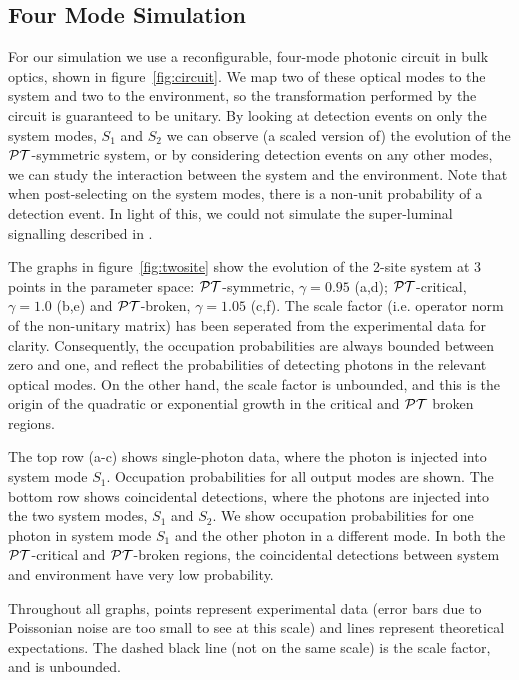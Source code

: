 \subsection{Four Mode Simulation}
\label{sec:FourMode}
For our simulation we use a reconfigurable, four-mode photonic circuit in bulk
optics, shown in figure~\ref{fig:circuit}. We map two of these optical
modes to the system and two to the environment, so the transformation performed
by the circuit is guaranteed to be unitary. By looking at detection events on
only the system modes, \(S_1\) and \(S_2\) we can observe (a scaled version of)
the evolution of the \(\mathcal{PT}{}\)-symmetric system, or by considering detection
events on any other modes, we can study the interaction between the system and
the environment. Note that when post-selecting on the system modes, there is a
non-unit probability of a detection event. In light of this, we could not
simulate the super-luminal signalling described in \cite{lee-prl-112-130404}.

The graphs in figure~\ref{fig:twosite} show the evolution of the 2-site system
at 3 points in the parameter space: \(\mathcal{PT}{}\)-symmetric, \(\gamma=0.95\) (a,d);
\(\mathcal{PT}{}\)-critical, \(\gamma=1.0\) (b,e) and \(\mathcal{PT}{}\)-broken, \(\gamma=1.05\)
(c,f). The scale factor (i.e. operator norm of the non-unitary matrix) has been
seperated from the experimental data for clarity. Consequently, the occupation
probabilities are always bounded between zero and one, and reflect the
probabilities of detecting photons in the relevant optical modes. On the other
hand, the scale factor is unbounded, and this is the origin of the quadratic or
exponential growth in the critical and \(\mathcal{PT}{}\) broken regions.

The top row (a-c) shows single-photon data, where the photon is injected into
system mode \(S_1\). Occupation probabilities for all output modes are shown.
The bottom row shows coincidental detections, where the photons are injected
into the two system modes, \(S_1\) and \(S_2\). We show occupation probabilities
for one photon in system mode \(S_1\) and the other photon in a different mode.
In both the \(\mathcal{PT}{}\)-critical and \(\mathcal{PT}{}\)-broken regions, the coincidental
detections between system and environment have very low probability.

Throughout all graphs, points represent experimental data (error bars due to
Poissonian noise are too small to see at this scale) and lines represent
theoretical expectations. The dashed black line (not on the same scale) is the
scale factor, and is unbounded.

